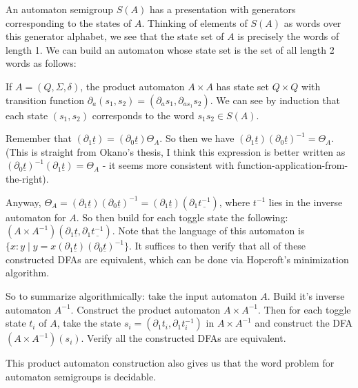 \documentclass[11pt]{article}
\theoremstyle{pleasant}
\newcommand{\0}{\underline{0}}
\newcommand{\1}{\underline{1}}
\newcommand{\2}{\underline{2}}
\begin{document}
An automaton semigroup $S(A)$ has a presentation with generators corresponding to the states of $A$. Thinking of elements of $S(A)$ as words over this generator alphabet, we see that the state set of $A$ is precisely the words of length 1. We can build an automaton whose state set is the set of all length 2 words as follows:

If $A = (Q, \Sigma, \delta)$, the product automaton $A \times A$ has state set $Q\times Q$ with transition function $\partial_a (s_1, s_2) = (\partial_a s_1, \partial_{a s_1} s_2)$. We can see by induction that each state $(s_1, s_2)$ corresponds to the word $s_1 s_2 \in S(A)$.

Remember that $(\partial_1 \underline{t}) = (\partial_0 \underline{t})\Theta_A$. So then we have $(\partial_1 \underline{t})(\partial_0 \underline{t})^{-1} = \Theta_A$. (This is straight from Okano's thesis, I think this expression is better written as $(\partial_0 \underline{t})^{-1}(\partial_1 \underline{t})= \Theta_A$ - it seems more consistent with function-application-from-the-right). 

Anyway, $\Theta_A = (\partial_1 \underline{t})(\partial_0 \underline{t})^{-1} = (\partial_1 \underline{t})(\partial_1 \underline{t^{-1}})$, where $t^{-1}$ lies in the inverse automaton for $A$. So then build for each toggle state the following: $(A\times A^{-1})(\partial_1 \underline{t}, \partial_1 \underline{t^{-1}})$. Note that the language of this automaton is $\{ x : y \mid y = x(\partial_1 \underline{t})(\partial_0 \underline{t})^{-1}\}$. It suffices to then verify that all of these constructed DFAs are equivalent, which can be done via Hopcroft's minimization algorithm.

So to summarize algorithmically: take the input automaton $A$. Build it's inverse automaton $A^{-1}$. Construct the product automaton $A\times A^{-1}$. Then for each toggle state $t_i$ of $A$, take the state $s_i = (\partial_1 t_i, \partial_1 t_i^{-1})$ in $A\times A^{-1}$ and construct the DFA $(A\times A^{-1})(s_i)$. Verify all the constructed DFAs are equivalent.


This product automaton construction also gives us that the word problem for automaton semigroups is decidable.

\end{document}
